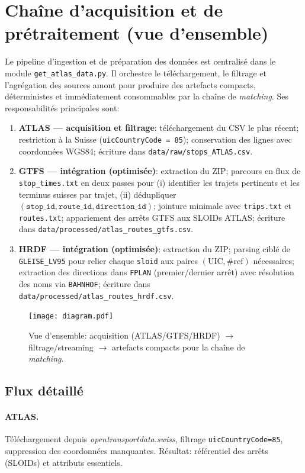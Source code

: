 \section{Chaîne d’acquisition et de prétraitement (vue d’ensemble)}
Le pipeline d’ingestion et de préparation des données est centralisé dans le module \texttt{get\_atlas\_data.py}. Il orchestre le téléchargement, le filtrage et l’agrégation des sources amont pour produire des artefacts compacts, déterministes et immédiatement consommables par la chaîne de \textit{matching}. Ses responsabilités principales sont:
\begin{enumerate}
  \item \textbf{ATLAS — acquisition et filtrage}: téléchargement du CSV le plus récent; restriction à la Suisse (\texttt{uicCountryCode = 85}); conservation des lignes avec coordonnées WGS84; écriture dans \texttt{data/raw/stops\_ATLAS.csv}.
  \item \textbf{GTFS — intégration (optimisée)}: extraction du ZIP; parcours en flux de \texttt{stop\_times.txt} en deux passes pour (i) identifier les trajets pertinents et les terminus suisses par trajet, (ii) dédupliquer \((\texttt{stop\_id},\texttt{route\_id},\texttt{direction\_id})\); jointure minimale avec \texttt{trips.txt} et \texttt{routes.txt}; appariement des arrêts GTFS aux SLOIDs ATLAS; écriture dans \texttt{data/processed/atlas\_routes\_gtfs.csv}.
  \item \textbf{HRDF — intégration (optimisée)}: extraction du ZIP; parsing ciblé de \texttt{GLEISE\_LV95} pour relier chaque \texttt{sloid} aux paires \((\text{UIC}, \#\text{ref})\) nécessaires; extraction des directions dans \texttt{FPLAN} (premier/dernier arrêt) avec résolution des noms via \texttt{BAHNHOF}; écriture dans \texttt{data/processed/atlas\_routes\_hrdf.csv}.
\end{enumerate}

\begin{figure}[h]
  \centering
  \texttt{[image: diagram.pdf]}
  \caption[Vue d’ensemble du pipeline]{Vue d’ensemble: acquisition (ATLAS/GTFS/HRDF) \(\to\) filtrage/streaming \(\to\) artefacts compacts pour la chaîne de \textit{matching}.}
\end{figure}

\subsection{Flux détaillé}
\paragraph{ATLAS.} Téléchargement depuis \textit{opentransportdata.swiss}, filtrage \texttt{uicCountryCode=85}, suppression des coordonnées manquantes. Résultat: référentiel des arrêts (SLOIDs) et attributs essentiels.

